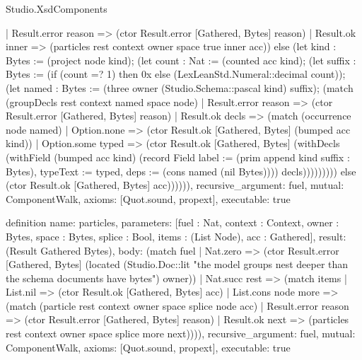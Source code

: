 \begin{lexlean}{Studio.XsdComponents}
\begin{semanticmodule}
{      | Result.error reason => (ctor Result.error [Gathered, Bytes] reason)
      | Result.ok inner => (particles rest context owner space true inner acc)) else (let kind : Bytes := (project node kind); (let count : Nat := (counted acc kind); (let suffix : Bytes := (if (count =? 1) then 0x else (LexLeanStd.Numeral::decimal count)); (let named : Bytes := (three owner (Studio.Schema::pascal kind) suffix); (match (groupDecls rest context named space node)
      | Result.error reason => (ctor Result.error [Gathered, Bytes] reason)
      | Result.ok decls => (match (occurrence node named)
        | Option.none => (ctor Result.ok [Gathered, Bytes] (bumped acc kind))
        | Option.some typed => (ctor Result.ok [Gathered, Bytes] (withDecls (withField (bumped acc kind) (record Field {label := (prim append kind suffix : Bytes), typeText := typed, deps := (cons named (nil Bytes))})) decls))))))))) else (ctor Result.ok [Gathered, Bytes] acc)))))),
  recursive_argument: fuel,
  mutual: ComponentWalk,
  axioms: [Quot.sound, propext],
  executable: true
}

definition{
  name: particles,
  parameters: [fuel : Nat, context : Context, owner : Bytes, space : Bytes, splice : Bool, items : (List Node), acc : Gathered],
  result: (Result Gathered Bytes),
  body: (match fuel
    | Nat.zero => (ctor Result.error [Gathered, Bytes] (located (Studio.Doc::lit "the model groups nest deeper than the schema documents have bytes") owner))
    | Nat.succ rest => (match items
      | List.nil => (ctor Result.ok [Gathered, Bytes] acc)
      | List.cons node more => (match (particle rest context owner space splice node acc)
        | Result.error reason => (ctor Result.error [Gathered, Bytes] reason)
        | Result.ok next => (particles rest context owner space splice more next)))),
  recursive_argument: fuel,
  mutual: ComponentWalk,
  axioms: [Quot.sound, propext],
  executable: true
}


\end{semanticmodule}
\end{lexlean}
